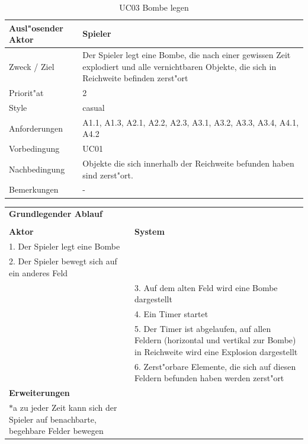 \begin{table}[H]
  \begin{center}
    \begin{tabular}{|p{40mm}|p{90mm}|}
    \hline Ausl"osender Aktor & Spieler  \\
    \hline Zweck / Ziel & Der Spieler legt eine Bombe, die nach einer gewissen Zeit explodiert und
		                      alle vernichtbaren Objekte, die sich in Reichweite befinden zerst"ort\\
    \hline Priorit"at & 2 \\
    \hline Style & casual \\
    \hline Anforderungen &  A1.1, A1.3, A2.1, A2.2, A2.3, A3.1, A3.2, A3.3, A3.4, A4.1, A4.2\\
    \hline Vorbedingung & UC01 \\
    \hline Nachbedingung & Objekte die sich innerhalb der Reichweite befunden haben sind zerst"ort. \\
    \hline Bemerkungen & - \\
    \hline
    \end{tabular}
  \end{center}
  \caption{UC03 Bombe legen}
\end{table}


\begin{center}
  \begin{tabular}{p{65mm} p{65mm}}
  \multicolumn{2}{l}{\textbf{Grundlegender Ablauf}} \\
  & \\
  \textbf{Aktor} & \textbf{System} \\
  1. Der Spieler legt eine Bombe &  \\
	2. Der Spieler bewegt sich auf ein anderes Feld& \\
  &  3. Auf dem alten Feld wird eine Bombe dargestellt  \\
  &  4. Ein Timer startet \\
  &  5. Der Timer ist abgelaufen, auf allen Feldern (horizontal und vertikal zur Bombe) in Reichweite 
	wird eine Explosion dargestellt \\
  &  6. Zerst"orbare Elemente, die sich auf diesen Feldern befunden haben werden zerst"ort\\
  \multicolumn{2}{l}{\textbf{Erweiterungen}} \\
  \(\ast\)a zu jeder Zeit kann sich der Spieler auf benachbarte, begehbare Felder bewegen & \\
  \end{tabular}
\end{center}



